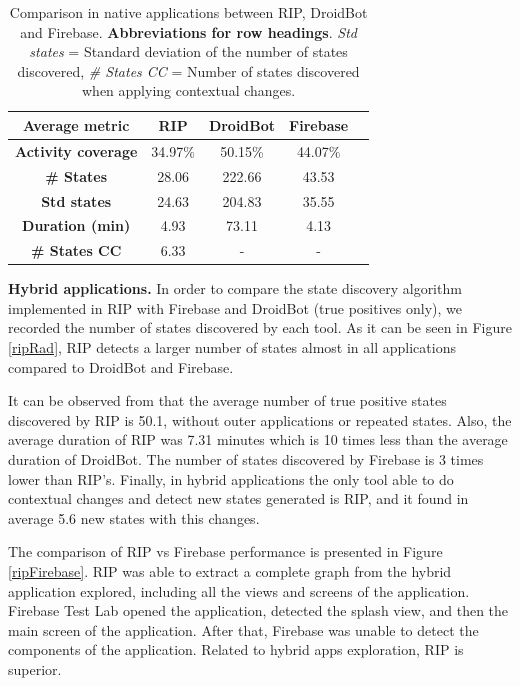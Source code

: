 \begin{table}[t]
	\centering
	\caption{Comparison in native applications between RIP, DroidBot and Firebase. \textbf{Abbreviations for row headings}. \textit{Std states} = Standard deviation of the number of states discovered,  \textit{\# States CC} = Number of states discovered when applying contextual changes. }
	\label{comparisonRIP}
	\begin{adjustbox}{width=0.6\textwidth}
		\begin{tabular}{|c|c|c|c|c|}
			\hline
			\textbf{Average metric}&\textbf{RIP} & \textbf{DroidBot} & \textbf{Firebase} \\\hline
			\textbf{Activity coverage}& 34.97\% & 50.15\% & 44.07\% \\\hline
			\textbf{\# States}& 28.06 & 222.66 & 43.53 \\\hline
			\textbf{Std states}& 24.63 & 204.83 & 35.55 \\\hline
			\textbf{Duration (min)}& 4.93 & 73.11 & 4.13 \\\hline
			\textbf{\# States CC}& 6.33 & - & - \\\hline
			
		\end{tabular}
	\end{adjustbox}
\end{table}


\textbf{Hybrid applications.} In order to compare the state discovery algorithm implemented in RIP with Firebase and DroidBot (true positives only), we recorded the number of states discovered by each tool.  As it can be seen in Figure \ref{ripRad}, RIP detects a larger number of states almost in all applications compared to DroidBot and Firebase. 

It can be observed from  that the average number of true positive states discovered by RIP is 50.1, without outer applications or repeated states. Also, the average duration of RIP was 7.31 minutes which is 10 times less than the average duration of DroidBot. The number of states discovered by Firebase is 3 times lower than RIP's. Finally, in hybrid applications the only tool able to do contextual changes and detect new states generated is RIP, and it found in average 5.6 new states with this changes. 

The comparison of RIP vs Firebase performance is presented in Figure \ref{ripFirebase}. RIP was able to extract a complete graph from the hybrid application explored, including all the views and screens of the application. Firebase Test Lab opened the application, detected the splash view, and then the main screen of the application. After that, Firebase was unable to detect the components of the application. Related to hybrid apps exploration, RIP is superior.


